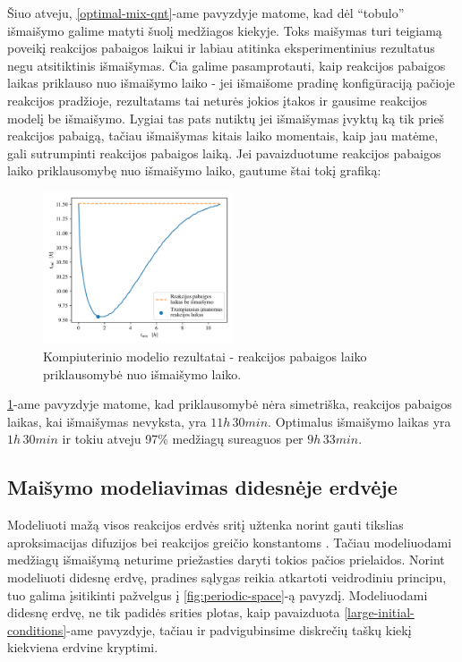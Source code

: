 Šiuo atveju, \ref{optimal-mix-qnt}-ame pavyzdyje matome, kad dėl \enquote{tobulo} išmaišymo galime matyti šuolį medžiagos kiekyje. Toks maišymas turi teigiamą poveikį reakcijos pabaigos laikui ir labiau atitinka eksperimentinius rezultatus negu atsitiktinis išmaišymas.
Čia galime pasamprotauti, kaip reakcijos pabaigos laikas priklauso nuo išmaišymo laiko - jei išmaišome pradinę konfigūraciją pačioje reakcijos pradžioje, rezultatams tai neturės jokios įtakos ir gausime reakcijos modelį be išmaišymo. Lygiai tas pats nutiktų jei išmaišymas įvyktų ką tik prieš reakcijos pabaigą, tačiau išmaišymas kitais laiko momentais, kaip jau matėme, gali sutrumpinti reakcijos pabaigos laiką. Jei pavaizduotume reakcijos pabaigos laiko priklausomybę nuo išmaišymo laiko, gautume štai tokį grafiką:

\begin{figure}[h!]
    \centering
    \includegraphics[width=0.5\textwidth]{../paper/assets/mix-end-1.png}

    \caption{Kompiuterinio modelio rezultatai - reakcijos pabaigos laiko priklausomybė nuo išmaišymo laiko. }

    \label{mix-end}
\end{figure}

\ref{mix-end}-ame pavyzdyje matome, kad priklausomybė nėra simetriška, reakcijos pabaigos laikas, kai išmaišymas nevyksta, yra $11h\, 30min$. Optimalus išmaišymo laikas yra $1h\, 30min$ ir tokiu atveju 97\% medžiagų sureaguos per $9h\,33min$.

\subsection{Maišymo modeliavimas didesnėje erdvėje}

Modeliuoti mažą visos reakcijos erdvės sritį užtenka norint gauti tikslias aproksimacijas difuzijos bei reakcijos greičio konstantoms \cite{mackeviciusCloserLookComputer2012}. Tačiau modeliuodami medžiagų išmaišymą neturime priežasties daryti tokios pačios prielaidos. Norint modeliuoti didesnę erdvę, pradines sąlygas reikia atkartoti veidrodiniu principu, tuo galima įsitikinti pažvelgus į \ref{fig:periodic-space}-ą pavyzdį. Modeliuodami didesnę erdvę, ne tik padidės srities plotas, kaip pavaizduota \ref{large-initial-conditions}-ame pavyzdyje, tačiau ir padvigubinsime diskrečių taškų kiekį kiekviena erdvine kryptimi.


